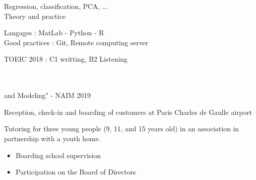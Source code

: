 


Regression, classification, PCA, ... \\
Theory and practice\\
\vspace{0.2cm}

Langages : MatLab - Python  - R\\
Good practices : Git, Remote computing server


\vspace{0.1cm}
TOEIC 2018 : C1 writting, B2 Listening


\vspace{0.5cm}

 \\
 \\ \hspace{0.5cm} and Modeling" - NAIM 2019
    




   Reception, check-in and boarding of customers at Paris Charles de Gaulle airport

\divider

Tutoring for three young people (9, 11, and 15 years old) in an association in
partnership with a youth home.

\divider

\begin{itemize}
\item Boarding school supervision
\item Participation on the Board of Directors
\end{itemize}


